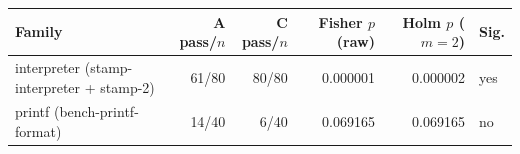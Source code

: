 \begin{tabular}{lrrrrl}
\toprule
Family & A pass/$n$ & C pass/$n$ & Fisher $p$ (raw) & Holm $p$ ($m=2$) & Sig. \\
\midrule
interpreter (stamp-interpreter + stamp-2) & 61/80 & 80/80 & 0.000001 & 0.000002 & yes \\
printf (bench-printf-format) & 14/40 & 6/40 & 0.069165 & 0.069165 & no \\
\bottomrule
\end{tabular}

